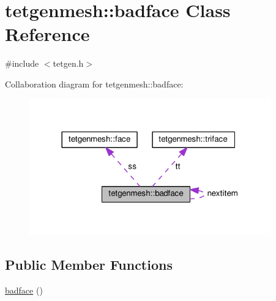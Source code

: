 \hypertarget{classtetgenmesh_1_1badface}{}\section{tetgenmesh\+:\+:badface Class Reference}
\label{classtetgenmesh_1_1badface}


{\ttfamily \#include $<$tetgen.\+h$>$}



Collaboration diagram for tetgenmesh\+:\+:badface\+:
\nopagebreak
\begin{figure}[H]
\begin{center}
\leavevmode
\includegraphics[width=296pt]{classtetgenmesh_1_1badface__coll__graph}
\end{center}
\end{figure}
\subsection*{Public Member Functions}
\begin{DoxyCompactItemize}
\item 
\hyperlink{classtetgenmesh_1_1badface_abb0568159042a95b91eb193fcfca6aab}{badface} ()
\end{DoxyCompactItemize}
